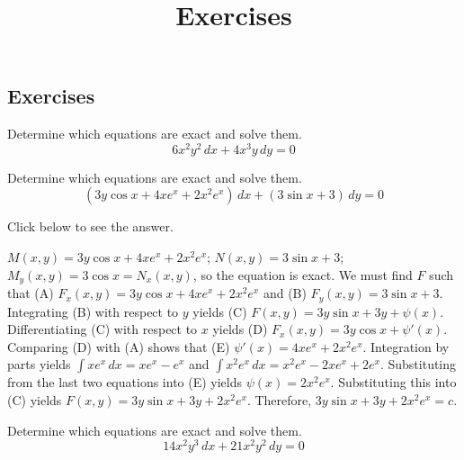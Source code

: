 \documentclass{ximera}
\title{Exercises} \license{CC BY-NC-SA 4.0}
\begin{document}
\begin{abstract}
\end{abstract}
\maketitle

\begin{onlineOnly}
\section*{Exercises}
\end{onlineOnly}





\begin{problem}\label{exer:2.5.1} Determine which equations are exact and solve them.
$$6x^2y^2\,dx+4x^3y\,dy=0$$
\end{problem}

\begin{problem}\label{exer:2.5.2} Determine which equations are exact and solve them.
$$(3y\cos x+4xe^x+2x^2e^x)\,dx+(3\sin x+3)\,dy=0$$

Click below to see the answer.

\begin{expandable}
    $M(x,y)=3y\cos x+4xe^x+2x^2e^x$;\;
$N(x,y)=3\sin x+3$;\;
$M_y(x,y)=3\cos x=N_x(x,y)$,
so the  equation is exact.
We must find $F$ such that
(A) $F_x(x,y)=3y\cos x+4xe^x+2x^2e^x$ and
(B) $F_y(x,y)=3\sin x+3$.
Integrating (B) with respect to $y$ yields
(C) $F(x,y)=3y\sin x+3y+\psi(x)$.
Differentiating (C) with respect to $x$  yields
(D) $F_x(x,y)=3y\cos x+\psi'(x)$.
Comparing (D) with (A)  shows that
(E) $\psi'(x)=4xe^x+2x^2e^x$.
Integration by parts yields
$\int xe^x\,dx=xe^x-e^x$ and
$\int x^2e^x\,dx=x^2e^x-2xe^x+2e^x$.
Substituting from the last two equations into (E) yields
$\psi(x)=2x^2e^x$.
Substituting this into (C) yields
$F(x,y)=3y\sin x+3y+2x^2e^x$.
Therefore, $3y\sin x+3y+2x^2e^x=c$.
\end{expandable}
\end{problem}

\begin{problem}\label{exer:2.5.3} Determine which equations are exact and solve them.
$$14x^2y^3\,dx+21 x^2y^2\,dy=0$$
\end{problem}
\end{document}
